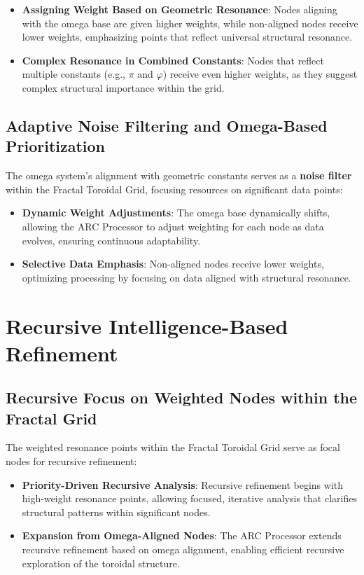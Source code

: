 \documentclass{article}
\begin{document}
\begin{itemize}
    \item \textbf{Assigning Weight Based on Geometric Resonance}: Nodes aligning with the omega base are given higher weights, while non-aligned nodes receive lower weights, emphasizing points that reflect universal structural resonance.
    \item \textbf{Complex Resonance in Combined Constants}: Nodes that reflect multiple constants (e.g., $\pi$ and $\varphi$) receive even higher weights, as they suggest complex structural importance within the grid.
\end{itemize}

\subsection{Adaptive Noise Filtering and Omega-Based Prioritization}

The omega system’s alignment with geometric constants serves as a \textbf{noise filter} within the Fractal Toroidal Grid, focusing resources on significant data points:
\begin{itemize}
    \item \textbf{Dynamic Weight Adjustments}: The omega base dynamically shifts, allowing the ARC Processor to adjust weighting for each node as data evolves, ensuring continuous adaptability.
    \item \textbf{Selective Data Emphasis}: Non-aligned nodes receive lower weights, optimizing processing by focusing on data aligned with structural resonance.
\end{itemize}

\section{Recursive Intelligence-Based Refinement}

\subsection{Recursive Focus on Weighted Nodes within the Fractal Grid}

The weighted resonance points within the Fractal Toroidal Grid serve as focal nodes for recursive refinement:
\begin{itemize}
    \item \textbf{Priority-Driven Recursive Analysis}: Recursive refinement begins with high-weight resonance points, allowing focused, iterative analysis that clarifies structural patterns within significant nodes.
    \item \textbf{Expansion from Omega-Aligned Nodes}: The ARC Processor extends recursive refinement based on omega alignment, enabling efficient recursive exploration of the toroidal structure.
\end{itemize}
\end{document}
